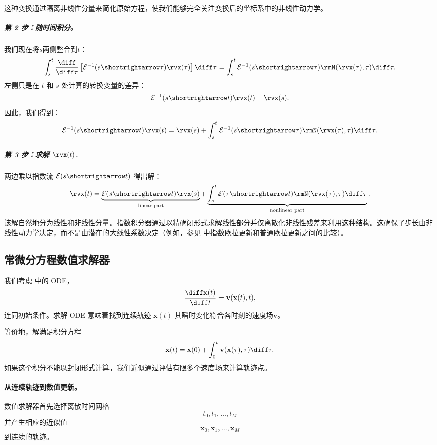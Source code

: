 这种变换通过隔离非线性分量来简化原始方程，使我们能够完全关注变换后的坐标系中的非线性动力学。

\subparagraph{第 2 步：随时间积分。}
我们现在将$s$两侧整合到$t$：
\[
\int_s^t \frac{\diff}{\diff \tau} \left[ \mathcal{E}^{-1}(s \shortrightarrow \tau) \rvx(\tau) \right] \diff \tau
= \int_s^t \mathcal{E}^{-1}(s \shortrightarrow \tau) \rmN(\rvx(\tau), \tau)\diff \tau.
\]
左侧只是在 $t$ 和 $s$ 处计算的转换变量的差异：
\[
\mathcal{E}^{-1}(s \shortrightarrow t) \rvx(t) - \rvx(s).
\]
因此，我们得到：
\[
\mathcal{E}^{-1}(s \shortrightarrow t) \rvx(t)
= \rvx(s) + \int_s^t \mathcal{E}^{-1}(s \shortrightarrow \tau) \rmN(\rvx(\tau), \tau)\diff \tau.
\]

\subparagraph{第 3 步：求解 $\rvx(t)$.}
两边乘以指数流 $\mathcal{E}(s \shortrightarrow t)$ 得出解：
\begin{align}\label{eq:exp-int-factor-integration}
    \rvx(t) = \underbrace{\mathcal{E}(s \shortrightarrow t)  \rvx(s)}_{\text{linear part}} + \underbrace{\int_s^t \mathcal{E}(\tau \shortrightarrow t) \rmN(\rvx(\tau), \tau)\diff \tau}_{\text{nonlinear part}} .
\end{align}该解自然地分为线性和非线性分量。指数积分器通过以精确闭形式求解线性部分并仅离散化非线性残差来利用这种结构。这确保了步长由非线性动力学决定，而不是由潜在的大线性系数决定（例如，参见  中指数欧拉更新和普通欧拉更新之间的比较）。


\subsection{常微分方程数值求解器}
\label{app:de-solver}

我们考虑  中的 ODE，
\[
\frac{\diff\mathbf{x}(t)}{\diff t}
=
\mathbf{v}(\mathbf{x}(t),t),
\]
连同初始条件。求解 ODE 意味着找到连续轨迹 $\mathbf{x}(t)$ 其瞬时变化符合各时刻的速度场$\mathbf{v}$。

等价地，解满足积分方程
\begin{equation}
\label{eq:integral_form}
\mathbf{x}(t)
=
\mathbf{x}(0)
+
\int_0^t
\mathbf{v}(\mathbf{x}(\tau),\tau)\diff\tau.
\end{equation}
如果这个积分不能以封闭形式计算，我们近似通过评估有限多个速度场来计算轨迹点。

\paragraph{从连续轨迹到数值更新。}
数值求解器首先选择离散时间网格
\[
t_0,t_1,\ldots,t_M
\]
并产生相应的近似值
\[
\mathbf{x}_0,\mathbf{x}_1,\ldots,\mathbf{x}_M
\]
到连续的轨迹。

